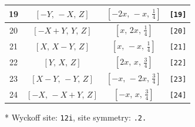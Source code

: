 \documentclass[fleqn,8pt]{jsarticle}
\begin{document}
\begin{longtable}{cccc}
19 & $\left[ - Y,\, - X,\, Z \right]$ & $\left[ - 2 x,\, - x,\, \frac{1}{4} \right]$ & {\tt [19]} \\ \hline
20 & $\left[ - X + Y,\, Y,\, Z \right]$ & $\left[ x,\, 2 x,\, \frac{1}{4} \right]$ & {\tt [20]} \\ \hline
21 & $\left[ X,\, X - Y,\, Z \right]$ & $\left[ x,\, - x,\, \frac{1}{4} \right]$ & {\tt [21]} \\ \hline
22 & $\left[ Y,\, X,\, Z \right]$ & $\left[ 2 x,\, x,\, \frac{3}{4} \right]$ & {\tt [22]} \\ \hline
23 & $\left[ X - Y,\, - Y,\, Z \right]$ & $\left[ - x,\, - 2 x,\, \frac{3}{4} \right]$ & {\tt [23]} \\ \hline
24 & $\left[ - X,\, - X + Y,\, Z \right]$ & $\left[ - x,\, x,\, \frac{3}{4} \right]$ & {\tt [24]} \\
\end{longtable}
* Wyckoff site: {\tt 12i}, site symmetry: {\tt .2.}
\renewcommand{\arraystretch}{1.2}
\end{document}
